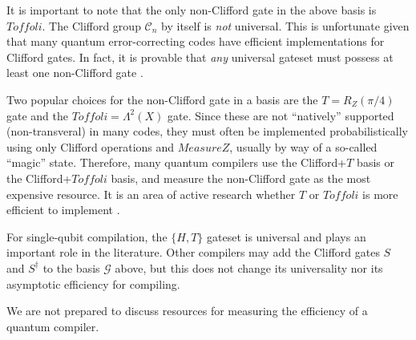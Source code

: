 It is important to note that the only non-Clifford gate in the above basis
is $Toffoli$.
The Clifford group $\mathcal{C}_n$ by itself is \emph{not}
universal.
This is unfortunate given that many quantum error-correcting codes have
efficient implementations for Clifford gates. In fact, it is provable
that \emph{any} universal gateset must possess at least one
non-Clifford gate \cite{Zeng2011}.

Two popular choices for the non-Clifford gate in a basis are the $T = R_Z(\pi/4)$
gate and the $Toffoli = \Lambda^2(X)$ gate. Since these are not ``natively''
supported (non-transveral) in many codes, they must often be implemented
probabilistically using only Clifford operations and $MeasureZ$, usually
by way of a so-called ``magic'' state.
Therefore, many quantum compilers
use the Clifford+$T$ basis or the Clifford+$Toffoli$ basis, and measure
the non-Clifford gate as the most expensive resource. It is an area of
active research
whether $T$ or $Toffoli$ is more efficient to implement
\cite{Jones2013a,Eastin2012}.

For single-qubit compilation, the $\{H,T\}$ gateset is universal and
plays an important role in the literature. Other compilers may add
the Clifford gates $S$ and $S^{\dagger}$ to the basis $\mathcal{G}$ above,
but this does not change its universality nor its asymptotic efficiency for
compiling.

We are not prepared to discuss resources for measuring the efficiency of
a quantum compiler.